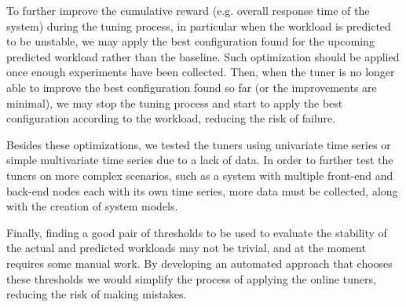 \documentclass[a4paper, 12pt]{article} %
\begin{document}
	To further improve the cumulative reward (e.g. overall response time of the system) during the tuning process, in particular when the workload is predicted to be unstable, we may apply the best configuration found for the upcoming predicted workload rather than the baseline. Such optimization should be applied once enough experiments have been collected. Then, when the tuner is no longer able to improve the best configuration found so far (or the improvements are minimal), we may stop the tuning process and start to apply the best configuration according to the workload, reducing the risk of failure.
	
	Besides these optimizations, we tested the tuners using univariate time series or simple multivariate time series due to a lack of data. In order to further test the tuners on more complex scenarios, such as a system with multiple front-end and back-end nodes each with its own time series, more data must be collected, along with the creation of system models. 
	
	Finally, finding a good pair of thresholds to be used to evaluate the stability of the actual and predicted workloads may not be trivial, and at the moment requires some manual work. By developing an automated approach that chooses these thresholds we would simplify the process of applying the online tuners, reducing the risk of making mistakes.
	
	\newpage
	 
	
	
	
\end{document}
